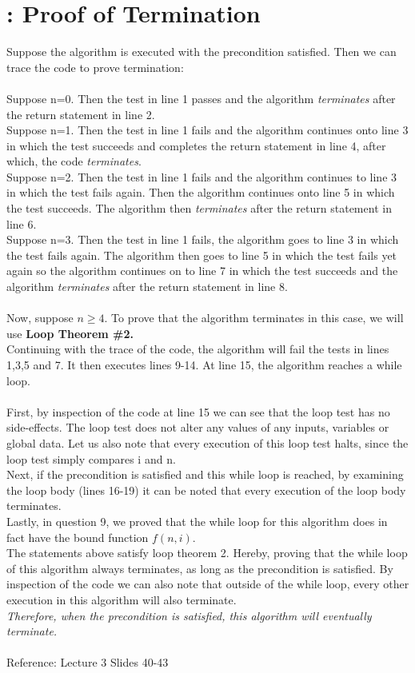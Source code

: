 \documentclass{article}
\begin{document}
    \section{: Proof of Termination}
    Suppose the algorithm is executed with the precondition satisfied. Then we can trace the code to prove termination:\\
    \\Suppose n=0. Then the test in line 1 passes and the algorithm \textit{terminates} after the return statement in line 2. \\
    Suppose n=1. Then the test in line 1 fails and the algorithm continues onto line 3 in which the test succeeds and completes the return statement in line 4, after which, the code \textit{terminates}. \\
    Suppose n=2. Then the test in line 1 fails and the algorithm continues to line 3 in which the test fails again. Then the algorithm continues onto line 5 in which the test succeeds. The algorithm then \textit{terminates} after the return statement in line 6.\\
    Suppose n=3. Then the test in line 1 fails, the algorithm goes to line 3 in which the test fails again. The algorithm then goes to line 5 in which the test fails yet again so the algorithm continues on to line 7 in which the test succeeds and the algorithm \textit{terminates} after the return statement in line 8.\\
    \\Now, suppose $n\geq 4$. To prove that the algorithm terminates in this case, we will use \textbf{Loop Theorem \#2.}\\
    Continuing with the trace of the code, the algorithm will fail the tests in lines 1,3,5 and 7. It then executes lines 9-14. At line 15, the algorithm reaches a while loop.\\
    \\First, by inspection of the code at line 15 we can see that the loop test has no side-effects. The loop test does not alter any values of any inputs, variables or global data. Let us also note that every execution of this loop test halts, since the loop test simply compares i and n.\\
    Next, if the precondition is satisfied and this while loop is reached, by examining the loop body (lines 16-19) it can be noted that every execution of the loop body terminates. \\
    Lastly, in question 9, we proved that the while loop for this algorithm does in fact have the bound function $f(n,i)$. \\
    The statements above satisfy loop theorem 2. Hereby, proving that the while loop of this algorithm always terminates, as long as the precondition is satisfied. By inspection of the code we can also note that outside of the while loop, every other execution in this algorithm will also terminate.
    \\ \textit{Therefore, when the precondition is satisfied, this algorithm will eventually terminate.}
    \\
    \\Reference: Lecture 3 Slides 40-43
    \\
\end{document}
